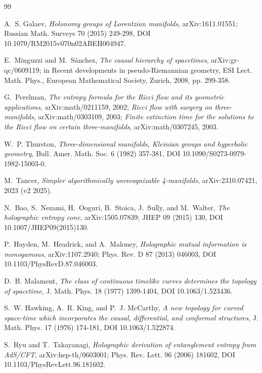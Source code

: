 \documentclass[11pt,letterpaper]{article}
\theoremstyle{definition}
\theoremstyle{remark}
\begin{document}
\begin{thebibliography}{99}\small

A.~S. Galaev, \emph{Holonomy groups of Lorentzian manifolds}, arXiv:1611.01551; Russian Math. Surveys 70 (2015) 249-298, DOI 10.1070/RM2015v070n02ABEH004947.

E.~Minguzzi and M.~S\'{a}nchez, \emph{The causal hierarchy of spacetimes}, arXiv:gr-qc/0609119; in Recent developments in pseudo-Riemannian geometry, ESI Lect. Math. Phys., European Mathematical Society, Zurich, 2008, pp. 299-358.

G.~Perelman, \emph{The entropy formula for the Ricci flow and its geometric applications}, arXiv:math/0211159, 2002; \emph{Ricci flow with surgery on three-manifolds}, arXiv:math/0303109, 2003; \emph{Finite extinction time for the solutions to the Ricci flow on certain three-manifolds}, arXiv:math/0307245, 2003.

W.~P. Thurston, \emph{Three-dimensional manifolds, Kleinian groups and hyperbolic geometry}, Bull. Amer. Math. Soc. 6 (1982) 357-381, DOI 10.1090/S0273-0979-1982-15003-0.

M.~Tancer, \emph{Simpler algorithmically unrecognizable 4-manifolds}, arXiv:2310.07421, 2023 (v2 2025).

N.~Bao, S.~Nezami, H.~Ooguri, B.~Stoica, J.~Sully, and M.~Walter, \emph{The holographic entropy cone}, arXiv:1505.07839; JHEP 09 (2015) 130, DOI 10.1007/JHEP09(2015)130.

P.~Hayden, M.~Headrick, and A.~Maloney, \emph{Holographic mutual information is monogamous}, arXiv:1107.2940; Phys. Rev. D 87 (2013) 046003, DOI 10.1103/PhysRevD.87.046003.

D.~B. Malament, \emph{The class of continuous timelike curves determines the topology of spacetime}, J. Math. Phys. 18 (1977) 1399-1404, DOI 10.1063/1.523436.

S.~W. Hawking, A.~R. King, and P.~J. McCarthy, \emph{A new topology for curved space-time which incorporates the causal, differential, and conformal structures}, J. Math. Phys. 17 (1976) 174-181, DOI 10.1063/1.522874.

S.~Ryu and T.~Takayanagi, \emph{Holographic derivation of entanglement entropy from AdS/CFT}, arXiv:hep-th/0603001; Phys. Rev. Lett. 96 (2006) 181602, DOI 10.1103/PhysRevLett.96.181602.


\end{thebibliography}
\end{document}
